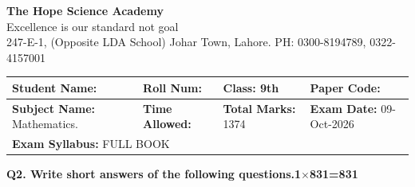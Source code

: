 \documentclass[11pt,a4paper]{article}
\begin{document}
\begin{center}
  {\Huge\bfseries The Hope Science Academy}\\[3pt]
  {\small Excellence is our standard not goal}\\[2pt]
  {\small 247-E-1, (Opposite LDA School) Johar Town, Lahore. PH: 0300-8194789, 0322-4157001}
\end{center}
\medskip\noindent
\begin{tabularx}{\linewidth}{|X|X|X|X|}
\hline
\textbf{Student Name:} & \textbf{Roll Num:} & \textbf{Class:} 9th & \textbf{Paper Code:} \\ \hline
\textbf{Subject Name:} Mathematics. & \textbf{Time Allowed:} & \textbf{Total Marks:} 1374 & \textbf{Exam Date:} 09-Oct-2026 \\ \hline
\multicolumn{4}{|l|}{\textbf{Exam Syllabus:} FULL BOOK} \\ \hline
\end{tabularx}
\bigskip
\noindent\textbf{Q2. Write short answers of the following questions.}\hfill\textbf{1$\times$831=831}
\end{document}
